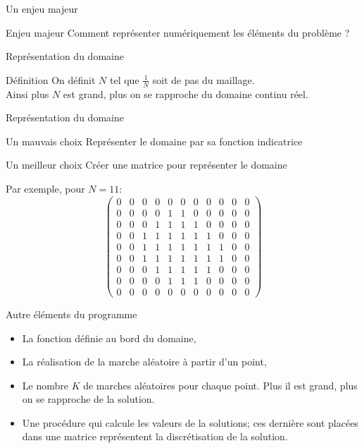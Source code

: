 \documentclass{beamer}
\begin{document}
\begin{frame}{Un enjeu majeur}
    \begin{alertblock}{Enjeu majeur}
        \Large{Comment représenter numériquement les éléments du problème ?}
    \end{alertblock}
\end{frame}

\begin{frame}{Représentation du domaine}
    \begin{block}{Définition}
        On définit $N$ tel que $\frac{1}{N}$ soit de pas du maillage. \\
        Ainsi plus $N$ est grand, plus on se rapproche du domaine continu réel.
    \end{block}
\end{frame}

\begin{frame}{Représentation du domaine}
    \begin{alertblock}{Un mauvais choix}
        Représenter le domaine par sa fonction indicatrice
    \end{alertblock}
    \begin{block}{Un meilleur choix}
        Créer une matrice pour représenter le domaine
    \end{block}
\end{frame}
\begin{frame}
    Par exemple, pour $N=11$:
    \[ \left(\begin{array}{ccccccccccc}
            0& 0& 0& 0& 0& 0& 0& 0& 0& 0& 0\\
            0& 0& 0& 0& 1& 1& 0& 0& 0& 0& 0\\
            0& 0& 0& 1& 1& 1& 1& 0& 0& 0& 0\\
            0& 0& 1& 1& 1& 1& 1& 1& 0& 0& 0\\
            0& 0& 1& 1& 1& 1& 1& 1& 1& 0& 0\\
            0& 0& 1& 1& 1& 1& 1& 1& 1& 0& 0\\
            0& 0& 0& 1& 1& 1& 1& 1& 0& 0& 0\\
            0& 0& 0& 0& 1& 1& 1& 0& 0& 0& 0\\
            0& 0& 0& 0& 0& 0& 0& 0& 0& 0& 0
        \end{array}\right)
    \]
\end{frame}

\begin{frame}{Autre éléments du programme}
    \begin{itemize}
        \item La fonction définie au bord du domaine,
        \item La réalisation de la marche aléatoire à partir d'un point,
        \item Le nombre $K$ de marches aléatoires pour chaque point. Plus il est grand, plus on 
            se rapproche de la solution.
        \item Une procédure qui calcule les valeurs de la solutions; ces dernière sont placées dans une matrice représentent la discrétisation de la solution.
    \end{itemize}
\end{frame}
\end{document}
